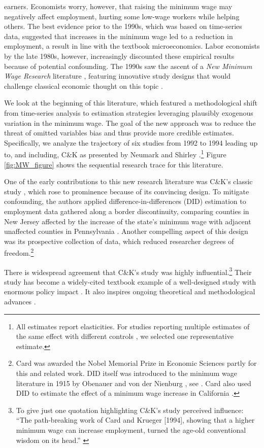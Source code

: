 earners. Economists worry, however, that raising the minimum wage may negatively affect
employment, hurting some low-wage workers while helping others. 
The best evidence prior to the 1990s, which was based on time-series data, suggested that increases in the minimum wage led to a reduction in employment, a result in line with the textbook microeconomics.
Labor economists by the late 1980s, however, increasingly discounted these empirical results because of potential confounding.
The 1990s saw the ascent of a \textit{New Minimum Wage Research} literature
\citep{Ehrenberg_92}, featuring innovative study designs that would challenge classical economic thought on this topic \citep{myth_95}. 

We look at the beginning of this literature, which featured a methodological shift from
time-series analysis to estimation strategies leveraging plausibly exogenous variation in the minimum wage. 
The goal of the new
approach was to reduce the threat of omitted variables bias and thus provide more credible estimates. Specifically, we analyze the trajectory of six
studies from 1992 to 1994 leading up to, and including, C\&K as presented by Neumark and Shirley
\citep{Neumark_Shirley_22}.\footnote{
All estimates report elasticities. For studies reporting multiple estimates of the same effect with different controls \citep{Cardb_1992,Neumark_1992}, we selected one representative estimate.} Figure \ref{fig:MW_figure} shows the sequential research trace for this literature. 

One of the early contributions to this new research literature was C\&K's
classic study \citep{Card_Krueger_94}, which rose to prominence because of its convincing design. To mitigate confounding, the authors applied 
difference-in-differences (DID) estimation to employment data gathered along a border discontinuity, comparing counties in New Jersey affected by the increase of the state's minimum wage with adjacent unaffected counties in Pennsylvania  \citep{nobel_21}. Another compelling aspect of this design was its prospective collection of data, which reduced researcher degrees of freedom.\footnote{Card was awarded
  the Nobel Memorial Prize in Economic Sciences partly for this and
  related work. DID itself was introduced to the minimum
  wage literature in 1915 by Obenauer and von
  der Nienburg \citep{Obenauer_Nienburg}, see
  \citep{Angrist_Pischke}. Card also used DID to estimate the effect of a minimum wage increase in California \citep{Card_92}.}

There is widespread agreement that C\&K's study was highly influential.\footnote{To give just one quotation
  highlighting C\&K's study perceived influence: ``The path-breaking
  work of Card and Krueger [1994], showing that a higher minimum wage
  can increase employment, turned the age-old conventional wisdom on
  its head.''  \citep{marjit_21}} Their study has become a widely-cited
textbook example of a well-designed study with enormous policy impact \citep{Angrist_Pischke}. It also inspires ongoing
theoretical \citep{Dube_16,Card_18,marjit_21,Renkin_22} and methodological advances
\citep{Neumark_13,Abadie_2005,Athey_2006,torous2024optimaltransportapproachestimating}.

